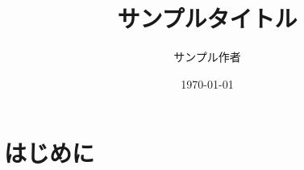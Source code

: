 \documentclass[uplatex]{jsarticle}
\title{サンプルタイトル}
\author{サンプル作者}
\date{\today}
\begin{document}
\maketitle
\newpage

\section{はじめに}

\begin{comment}
\begin{figure}[H]
    \centering
    \texttt{[image: sample.png]}
    \caption{サンプル}
    \label{sample}    %
\end{figure}

\begin{thebibliography}{99}
    \bibitem サイト名 \url{http} (閲覧日:)
    \bibitem 著者:本名前 出版社 (出版年)
\end{thebibliography}
\end{comment}
\end{document}
